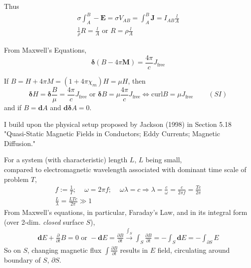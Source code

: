 \documentclass[10pt]{amsart}
\begin{document}
\begin{multicols*}{2}
Thus
\[
\begin{gathered}
	\sigma \int_A^B -\mathbf{E} = \sigma V_{AB} = \int_A^B \mathbf{J} = I_{AB} \frac{l}{A} \\
\frac{1}{\rho} R = \frac{l}{A} \text{ or } \boxed{ R = \rho \frac{l}{A} }
\end{gathered}
\]


From Maxwell's Equations, 
\begin{equation}
	\mathbf{\delta}(B - 4\pi \mathbf{M} ) = \frac{4\pi }{c} J_{\text{free}} 
\end{equation}	

If $B=H+4\pi M = (1+4\pi \chi_m) H = \mu H$, 
then
\begin{equation}
\mathbf{\delta}H = \mathbf{\delta} \frac{B}{\mu} = \frac{ 4\pi }{c} J_{\text{free} }\text{ or } \mathbf{\delta} B = \mu \frac{4\pi }{c} J_{\text{free}} \Longleftrightarrow \text{curl} B = \mu J_{\text{free}} \qquad \, (SI)
\end{equation}
and if $B=\mathbf{d}A$ and $\mathbf{d} \mathbf{\delta}A =0$.  


I build upon the physical setup proposed by Jackson (1998) \cite{Jack1998} in Section 5.18 "Quasi-Static Magnetic Fields in Conductors; Eddy Currents; Magnetic Diffusion."   

For a system (with characteristic) length $L$, $L$ being small, \\
compared to electromagnetic wavelength associated with dominant time scale of problem $T$, 
\[
\begin{gathered}
	f := \frac{1}{T} ; \quad \, \omega = 2\pi f ; \quad \, \omega \lambda = c \Longrightarrow \lambda = \frac{c}{ \omega } = \frac{c}{ 2\pi f } = \frac{Tc}{2\pi }  \\
\frac{L}{\lambda} = \frac{LTc}{2\pi } \gg 1
\end{gathered}
\]
From Maxwell's equations, in particular, Faraday's Law, and in its integral form (over 2-dim. \emph{closed} surface $S$), 
\begin{equation}
\begin{gathered}
\mathbf{d}E + \frac{ \partial }{ \partial t } B = 0 \text{ or } -\mathbf{d}E =\frac{ \partial B}{ \partial t} \xrightarrow{ \int_S } \int_S \frac{ \partial B}{ \partial t} = -\int_S \mathbf{d}E = -\int_{\partial S} E
\end{gathered}
\end{equation}
So on $S$, changing magnetic flux $\int \frac{ \partial B}{ \partial t}$ results in $E$ field, circulating around boundary of $S$, $\partial S$.  


\end{multicols*}
\end{document}
